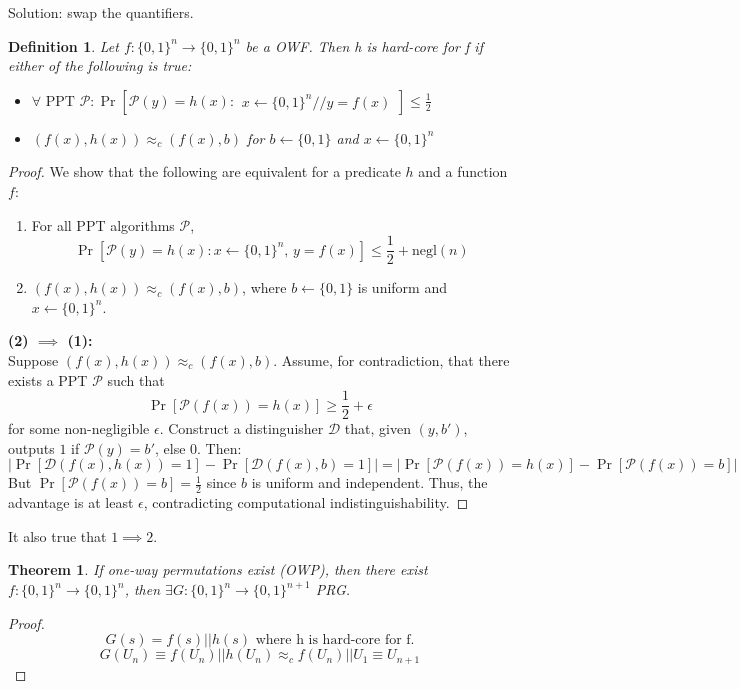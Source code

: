 \documentclass[11pt, a4paper]{article}
\newtheorem{thm}{Theorem}
\newtheorem{defn}{Definition}
\begin{document}
Solution: swap the quantifiers.
\begin{defn}
    Let $f : \{0,1\}^n \rightarrow \{0,1\}^n$ be a OWF. Then h is hard-core for f if either of the following is true:
    \begin{itemize}
        \item $\forall \text{ PPT } \mathcal{P}\colon \Pr[\mathcal{P}(y) = h(x): \substack{x \leftarrow \{0,1\}^n // y = f(x)}] \leq \frac{1}{2}$
        \item $(f(x),h(x)) \approx_c (f(x),b)$ for $b \leftarrow \{0,1\}$ and $x \leftarrow \{0,1\}^n$
    \end{itemize}
\end{defn}
\begin{proof}
We show that the following are equivalent for a predicate $h$ and a function $f$:
\begin{enumerate}
    \item For all PPT algorithms $\mathcal{P}$,
    \[
        \Pr\left[\mathcal{P}(y) = h(x) : x \leftarrow \{0,1\}^n,\, y = f(x)\right] \leq \frac{1}{2} + \text{negl}(n)
    \]
    \item $(f(x), h(x)) \approx_c (f(x), b)$, where $b \leftarrow \{0,1\}$ is uniform and $x \leftarrow \{0,1\}^n$.
\end{enumerate}

\textbf{(2) $\implies$ (1):} \\
Suppose $(f(x), h(x)) \approx_c (f(x), b)$. Assume, for contradiction, that there exists a PPT $\mathcal{P}$ such that
\[
    \Pr[\mathcal{P}(f(x)) = h(x)] \geq \frac{1}{2} + \epsilon
\]
for some non-negligible $\epsilon$. Construct a distinguisher $\mathcal{D}$ that, given $(y, b')$, outputs $1$ if $\mathcal{P}(y) = b'$, else $0$. Then:
\[
    \left| \Pr[\mathcal{D}(f(x), h(x)) = 1] - \Pr[\mathcal{D}(f(x), b) = 1] \right| = \left| \Pr[\mathcal{P}(f(x)) = h(x)] - \Pr[\mathcal{P}(f(x)) = b] \right|
\]
But $\Pr[\mathcal{P}(f(x)) = b] = \frac{1}{2}$ since $b$ is uniform and independent. Thus, the advantage is at least $\epsilon$, contradicting computational indistinguishability.

\end{proof}
It also true that $1 \implies 2$.\\
\begin{thm}
    If one-way permutations exist (OWP), then there exist $f\colon\{0,1\}^n \rightarrow \{0,1\}^n$, then $\exists G\colon\{0,1\}^n \rightarrow\{0,1\}^{n+1}$ PRG.
\end{thm}
\begin{proof}
    $$G(s) = f(s) || h(s) \text{ where h is hard-core for f.}$$
    $$G(U_n) \equiv f(U_n) || h(U_n) \approx_c f(U_n) || U_1 \equiv U_{n+1}$$
\end{proof}
\end{document}
